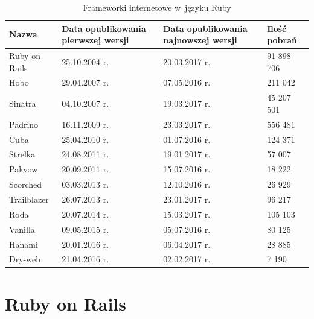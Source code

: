 \documentclass[archivemode]{mgr}
\begin{document}
\begin{table}[H]
  \caption{ Frameworki internetowe w~języku Ruby \protect\footnotemark}
  \centering
  \begin{tabularx}{1\linewidth}{|X|X|X|X|} \hline
    Nazwa & Data opublikowania \newline pierwszej wersji & Data opublikowania \newline  najnowszej wersji & Ilość pobrań \\ \hline
    \rowcolor{lightgray}
    Ruby on Rails & 25.10.2004 r. & 20.03.2017 r. & 91 898 706 \\ \hline
    Hobo & 29.04.2007 r. & 07.05.2016 r. & 211 042 \\ \hline
    Sinatra & 04.10.2007 r. & 19.03.2017 r. & 45 207 501 \\ \hline
    Padrino & 16.11.2009 r. & 23.03.2017 r. & 556 481 \\ \hline
    Cuba & 25.04.2010 r. & 01.07.2016 r. & 124 371 \\ \hline
    Strelka & 24.08.2011 r. & 19.01.2017 r. & 57 007 \\ \hline
    Pakyow & 20.09.2011 r. & 15.07.2016 r. & 18 222 \\ \Xhline{4\arrayrulewidth}
    Scorched & 03.03.2013 r. & 12.10.2016 r. & 26 929 \\ \hline
    Trailblazer & 26.07.2013 r. & 23.01.2017 r. & 96 217 \\ \hline
    \rowcolor{lightgray}
    Roda & 20.07.2014 r. & 15.03.2017 r. & 105 103 \\ \hline
    Vanilla & 09.05.2015 r. & 05.07.2016 r. & 80 125 \\ \Xhline{4\arrayrulewidth}
    \rowcolor{lightgray}
    Hanami & 20.01.2016 r. & 06.04.2017 r. & 28 885 \\ \hline
    Dry-web & 21.04.2016 r. & 02.02.2017 r. & 7 190 \\ \hline
  \end{tabularx}
\end{table}

\section{Ruby on Rails}
\end{document}
